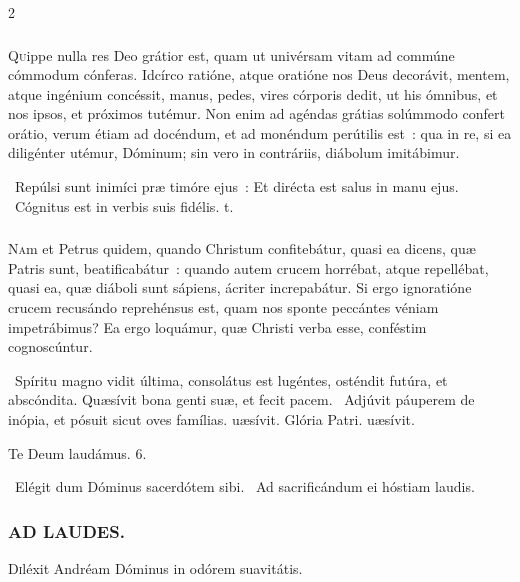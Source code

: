\documentclass[9pt,twoside]{extarticle}
\begin{document}
\begin{multicols}{2}
{{{\subsubsection*{\center {}}
\lettrine{Q}uippe nulla res Deo grátior est, quam ut univérsam vitam ad commúne cómmodum cónferas. Idcírco ratióne, atque oratióne nos Deus decorávit, mentem, atque ingénium concéssit, manus, pedes, vires córporis dedit, ut his ómnibus, et nos ipsos, et próximos tutémur. Non enim ad agéndas grátias solúmmodo confert orátio, verum étiam ad docéndum, et ad monéndum perútilis est~: qua in re, si ea diligénter utémur, Dóminum; sin vero in contráriis, diábolum imitábimur.

\begin{tightlist}{}
\item {}~Repúlsi sunt inimíci præ timóre ejus~: \textred{*} Et dirécta est salus in manu ejus. ~Cógnitus est in verbis suis fidélis. t.
\end{tightlist}

\subsubsection*{\center {}}
\lettrine{N}am et Petrus quidem, quando Christum confitebátur, quasi ea dicens, quæ Patris sunt, beatificabátur~: quando autem crucem horrébat, atque repellébat, quasi ea, quæ diáboli sunt sápiens, ácriter increpabátur. Si ergo ignoratióne crucem recusándo reprehénsus est, quam nos sponte peccántes véniam impetrábimus? Ea ergo loquámur, quæ Christi verba esse, conféstim cognoscúntur.

\begin{tightlist}{}
\item {}~Spíritu magno vidit última, consolátus est lugéntes, osténdit futúra, et abscóndita. \textred{*} Quæsívit bona genti suæ, et fecit pacem. ~Adjúvit páuperem de inópia, et pósuit sicut oves famílias. uæsívit. Glória Patri. uæsívit.
\item Te Deum laudámus. 6.
\item {}~Elégit dum Dóminus sacerdótem sibi. ~Ad sacrificándum ei hóstiam laudis.
\end{tightlist}

\subsubsection*{\center \textsc{AD LAUDES.}}
\begin{center} \end{center}
\lettrine{D}iléxit Andréam Dóminus in odórem suavitátis.

}}}
\end{multicols}
\end{document}
